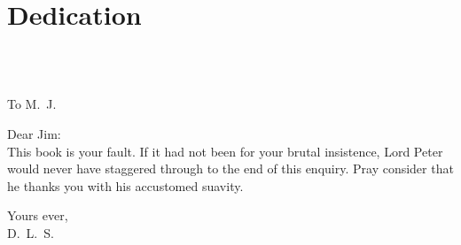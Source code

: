 \documentclass[
paper=5.5in:8.5in
]{scrbook}
\begin{document}
\frontmatter
 



\pagestyle{plain}




\chapter*{Dedication}
~\\
~\\
\begin{center}\Large
To M.~J.
\end{center}

\noindent Dear Jim:
~\\

This book is your fault. If it had not been for your brutal insistence, Lord Peter would never have staggered through to the end of this enquiry. Pray consider that he thanks you with his accustomed suavity.

\begin{flushright}
Yours ever,\\
D.~L.~S.
\end{flushright}


\tableofcontents

\mainmatter
{}
\pagestyle{headings}
















\clearpage
{}
\end{document}
